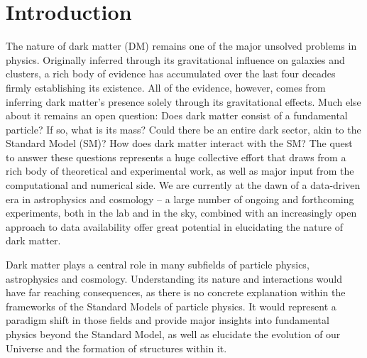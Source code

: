 \chapter{Introduction}
\label{ch:intro}

The nature of dark matter (DM) remains one of the major unsolved problems in physics. Originally inferred through its gravitational influence on galaxies and clusters, a rich body of evidence has accumulated over the last four decades firmly establishing its existence. All of the evidence, however, comes from inferring dark matter's presence solely through its gravitational effects. Much else about it remains an open question: Does dark matter consist  of a fundamental particle? If so, what is its mass? Could there be an entire dark sector, akin to the Standard Model (SM)? How does dark matter interact with the SM? The quest to answer these questions represents a huge collective effort that draws from a rich body of theoretical and experimental work, as well as major input from the computational and numerical side. We are currently at the dawn of a data-driven era in astrophysics and cosmology -- a large number of ongoing and forthcoming experiments, both in the lab and in the sky, combined with an increasingly open approach to data availability offer great potential in elucidating the nature of dark matter. 

Dark matter plays a central role in many subfields of particle physics, astrophysics and cosmology. Understanding its nature and interactions would have far reaching consequences, as there is no concrete explanation within the frameworks of the Standard Models of particle physics. It would represent a paradigm shift in those fields and provide major insights into fundamental physics beyond the Standard Model, as well as elucidate the evolution of our Universe and the formation of structures within it. 



